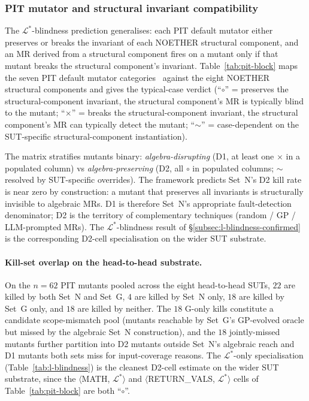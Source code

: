\documentclass[acmsmall,screen,review]{acmart}
\begin{document}
\subsubsection{PIT mutator and structural invariant compatibility}
\label{subsec:pit-block-matrix}

The $\mathcal{L}^{*}$-blindness prediction generalises: each PIT
default mutator either preserves or breaks the invariant of each
NOETHER structural component, and an MR derived from a structural component fires on a mutant only
if that mutant breaks the structural component's invariant. Table~\ref{tab:pit-block}
maps the seven PIT default mutator categories~\cite{Coles2016PIT}
against the eight NOETHER structural components and gives the typical-case verdict
(``$\circ$'' = preserves the structural-component invariant, the structural component's MR is
typically blind to the mutant; ``$\times$'' = breaks the structural-component
invariant, the structural component's MR can typically detect the mutant; ``$\sim$''
= case-dependent on the SUT-specific structural-component instantiation).

The matrix stratifies mutants binary: \emph{algebra-disrupting} (D1, at least one $\times$ in a populated column) vs \emph{algebra-preserving} (D2, all $\circ$ in populated columns; $\sim$ resolved by SUT-specific overrides). The framework predicts Set~N's D2 kill rate is near zero by construction: a mutant that preserves all invariants is structurally invisible to algebraic MRs. D1 is therefore Set~N's appropriate fault-detection denominator; D2 is the territory of complementary techniques (random / GP / LLM-prompted MRs). The $\mathcal{L}^{*}$-blindness result of \S\ref{subsec:l-blindness-confirmed} is the corresponding D2-cell specialisation on the wider SUT substrate.

\paragraph{Kill-set overlap on the head-to-head substrate.}
On the $n = 62$ PIT mutants pooled across the eight head-to-head
SUTs, $22$ are killed by both Set~N and Set~G, $4$ are killed by
Set~N only, $18$ are killed by Set~G only, and $18$ are killed by
neither. The $18$ G-only kills constitute a candidate scope-mismatch
pool (mutants reachable by Set~G's GP-evolved oracle but missed by
the algebraic Set~N construction), and the $18$ jointly-missed
mutants further partition into D2 mutants outside Set~N's algebraic
reach and D1 mutants both sets miss for input-coverage reasons.
The $\mathcal{L}^{*}$-only specialisation
(Table~\ref{tab:l-blindness}) is the cleanest D2-cell estimate on
the wider SUT substrate, since the
$\langle$MATH, $\mathcal{L}^{*}\rangle$ and
$\langle$RETURN\_VALS, $\mathcal{L}^{*}\rangle$ cells of
Table~\ref{tab:pit-block} are both ``$\circ$''.
\end{document}
